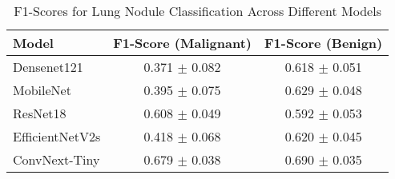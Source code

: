 \begin{table}[htbp]
    \centering
    \begin{tabular}{lcc}
        \toprule
        \textbf{Model} & \textbf{F1-Score (Malignant)} & \textbf{F1-Score (Benign)} \\
        \midrule
        Densenet121      & 0.371 $\pm$ 0.082 & 0.618 $\pm$ 0.051 \\
        MobileNet        & 0.395 $\pm$ 0.075 & 0.629 $\pm$ 0.048 \\
        ResNet18         & 0.608 $\pm$ 0.049 & 0.592 $\pm$ 0.053 \\
        EfficientNetV2s  & 0.418 $\pm$ 0.068 & 0.620 $\pm$ 0.045 \\
        \rowcolor{yellow!20}
        ConvNext-Tiny    & 0.679 $\pm$ 0.038 & 0.690 $\pm$ 0.035 \\
        \bottomrule
    \end{tabular}
    \caption{F1-Scores for Lung Nodule Classification Across Different Models}
    \label{tab:classification-performances}
\end{table}